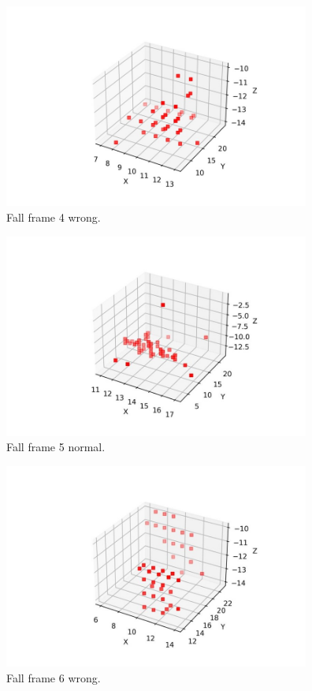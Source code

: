 \begin{figure}[H]
    \centering
    \includegraphics[width=380px, keepaspectratio=true]{appendix6.jpg}
    \caption{Fall frame 4 wrong.}
    \label{fig:my_label}
\end{figure}

\begin{figure}[H]
    \centering
    \includegraphics[width=380px, keepaspectratio=true]{appendix7.jpg}
    \caption{Fall frame 5 normal.}
    \label{fig:my_label}
\end{figure}

\begin{figure}[H]
    \centering
    \includegraphics[width=380px, keepaspectratio=true]{appendix8.jpg}
    \caption{Fall frame 6 wrong.}
    \label{fig:my_label}
\end{figure}